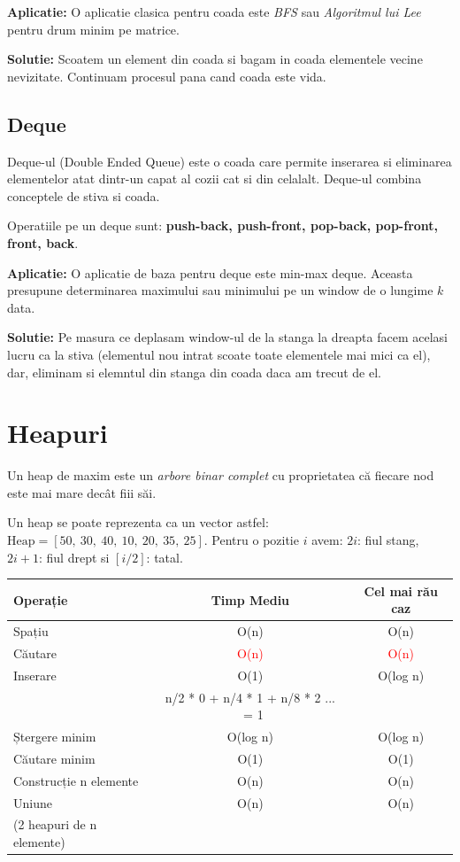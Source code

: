 \documentclass[11pt,a4paper]{article}
\theoremstyle{definition}
\theoremstyle{plain}
\theoremstyle{remark}
\begin{document}
\textbf{Aplicatie:}
O aplicatie clasica pentru coada este \textit{BFS} sau \textit{Algoritmul lui Lee} pentru drum minim pe matrice.

\textbf{Solutie:}
Scoatem un element din coada si bagam in coada elementele vecine nevizitate. Continuam procesul pana cand coada este vida.

\subsection{Deque}
Deque-ul (Double Ended Queue) este o coada care permite inserarea si eliminarea elementelor atat dintr-un capat al cozii cat si din celalalt. Deque-ul combina conceptele de stiva si coada.

Operatiile pe un deque sunt: \textbf{push-back, push-front, pop-back, pop-front, front, back}.

\textbf{Aplicatie:}
O aplicatie de baza pentru deque este min-max deque. Aceasta presupune determinarea maximului sau minimului pe un window de o lungime $k$ data.

\textbf{Solutie:}
Pe masura ce deplasam window-ul de la stanga la dreapta facem acelasi lucru ca la stiva (elementul nou intrat scoate toate elementele mai mici ca el), dar, eliminam si elemntul din stanga din coada daca am trecut de el.


\section{Heapuri}
Un heap de maxim este un \textit{arbore binar complet} cu proprietatea că fiecare nod este mai mare decât fiii săi.

Un heap se poate reprezenta ca un vector astfel:
$\text{Heap} = [50,\ 30,\ 40,\ 10,\ 20,\ 35,\ 25]$. Pentru o pozitie $i$ avem: $2i$: fiul stang, $2i+1$: fiul drept si $[i/2]$: tatal.

\bigskip
\begin{tabular}{|l|c|c|}
\hline
\textbf{Operație} & \textbf{Timp Mediu} & \textbf{Cel mai rău caz} \\
\hline
Spațiu & O(n) & O(n) \\
\hline
Căutare & \textcolor{red}{O(n)} & \textcolor{red}{O(n)} \\
\hline
Inserare & O(1) & O(log n) \\
 & n/2 * 0 + n/4 * 1 + n/8 * 2 ... ~= 1 & \\
\hline
Ștergere minim & O(log n) & O(log n) \\
\hline
Căutare minim & O(1) & O(1) \\
\hline
Construcție n elemente & O(n) & O(n) \\
\hline
Uniune & O(n) & O(n) \\
(2 heapuri de n elemente) & & \\
\hline
\end{tabular}
\end{document}
